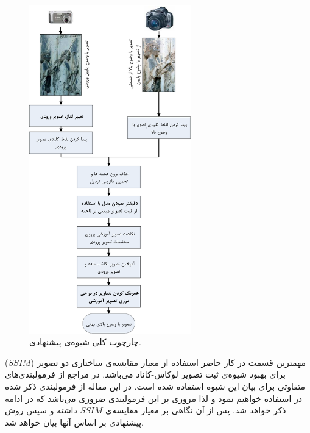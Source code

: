 \documentclass[11pt,a4paper,twocolumn]{article}
\numberwithin{table}{section}
\begin{document}
\begin{figure}
\centering 
\includegraphics[width=70mm]{Images/OneLR_oneHR.pdf}
\caption{چارچوب کلی شیوه‌ی پیشنهادی.}
\label{fig:OneLR_oneHR}
\end{figure}


مهمترین قسمت در کار حاضر استفاده از معیار مقایسه‌ی ساختاری دو تصویر ($SSIM$) برای بهبود شیوه‌ی ثبت تصویر لوکاس-کاناد\cite{Lucas81iterative} می‌باشد. در مراجع از فرمولبندی‌های متفاوتی برای بیان این شیوه استفاده شده است. در این مقاله از فرمولبندی ذکر شده در \cite{Baker04lucas-kanade20part1} استفاده خواهیم نمود و لذا مروری بر این فرمولبندی ضروری می‌باشد که در ادامه ذکر خواهد شد. پس از آن نگاهی بر معیار مقایسه‌ی $SSIM$ داشته و سپس روش پیشنهادی بر اساس آنها بیان خواهد شد.
%
\end{document}

